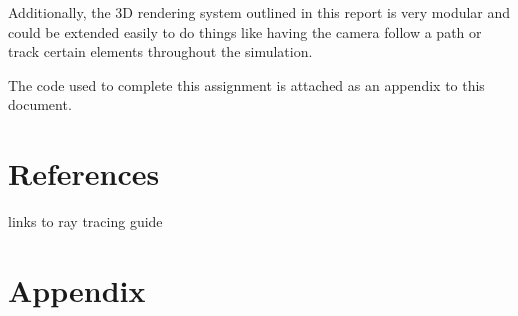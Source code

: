 \documentclass{article}
\begin{document}
Additionally, the 3D rendering system outlined in this report is very modular and could be extended easily to 
do things like having the camera follow a path or track certain elements throughout the simulation.

The code used to complete this assignment is attached as an appendix to this document.

\section{References}
links to ray tracing guide


\newpage
\onecolumn
\section{Appendix}



\end{document}
